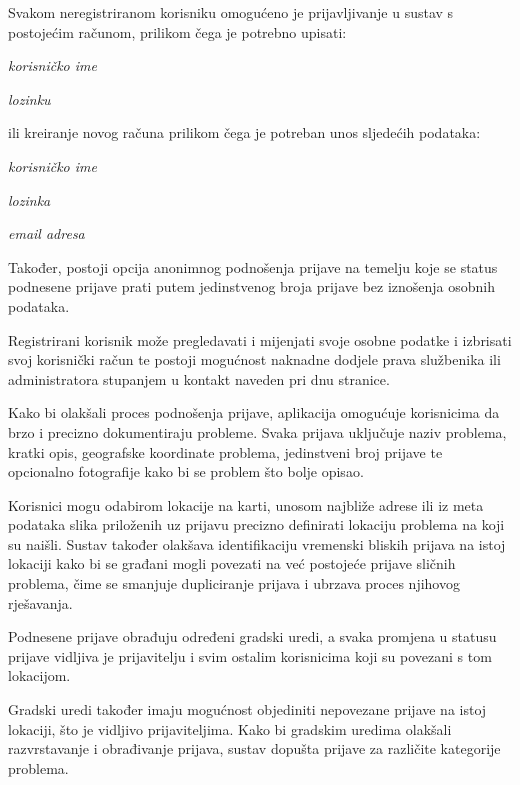 \noindent Svakom neregistriranom korisniku omogućeno je prijavljivanje u sustav s postojećim računom, prilikom čega je potrebno upisati:

\begin{packed_item}
	\item \textit{korisničko ime}
	\item \textit{lozinku}
\end{packed_item}

\noindent ili kreiranje novog računa prilikom čega je potreban unos sljedećih podataka:

\begin{packed_item}
	\item \textit{korisničko ime}
	\item \textit{lozinka}
	\item \textit{email adresa}
\end{packed_item}

\noindent Također, postoji opcija anonimnog podnošenja prijave na temelju koje se status podnesene prijave prati putem jedinstvenog broja prijave bez iznošenja osobnih podataka.

\noindent Registrirani korisnik može pregledavati i mijenjati svoje osobne podatke i izbrisati svoj korisnički račun te postoji mogućnost naknadne dodjele prava službenika ili administratora stupanjem u kontakt naveden pri dnu stranice.

\noindent Kako bi olakšali proces podnošenja prijave, aplikacija omogućuje korisnicima da brzo i precizno dokumentiraju probleme. Svaka prijava uključuje naziv problema, kratki opis, geografske koordinate problema, jedinstveni broj prijave te opcionalno fotografije kako bi se problem što bolje opisao.

\noindent Korisnici mogu odabirom lokacije na karti, unosom najbliže adrese ili iz meta podataka slika priloženih uz prijavu precizno definirati lokaciju problema na koji su naišli. Sustav također olakšava identifikaciju vremenski bliskih prijava na istoj lokaciji kako bi se građani mogli povezati na već postojeće prijave sličnih problema, čime se smanjuje dupliciranje prijava i ubrzava proces njihovog rješavanja.

\noindent Podnesene prijave obrađuju određeni gradski uredi, a svaka promjena u statusu prijave vidljiva je prijavitelju i svim ostalim korisnicima koji su povezani s tom lokacijom.

\noindent Gradski uredi također imaju mogućnost objediniti nepovezane prijave na istoj lokaciji, što je vidljivo prijaviteljima. Kako bi gradskim uredima olakšali razvrstavanje i obrađivanje prijava, sustav dopušta prijave za različite kategorije problema.

